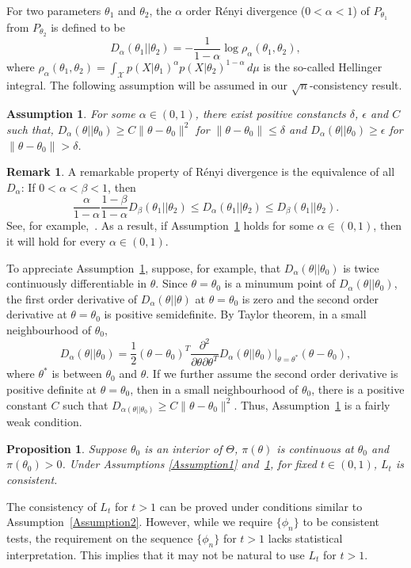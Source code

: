 \documentclass[3p]{elsarticle}
\theoremstyle{plain}
\newtheorem{proposition}{\quad\quad Proposition}
\newtheorem{assumption}{\quad\quad Assumption}
\theoremstyle{definition}
\newtheorem{remark}{\quad\quad Remark}
\theoremstyle{remark}
\begin{document}
 For two parameters $\theta_1$ and $\theta_2$, the $\alpha$ order R\'{e}nyi divergence ($0<\alpha<1$) of $P_{\theta_1}$ from $P_{\theta_2}$ is defined to be
$$
D_{\alpha}(\theta_1||\theta_2)=-\frac{1}{1-\alpha}\log \rho_{\alpha}(\theta_1,\theta_2),
$$
where
$
\rho_{\alpha}(\theta_1,\theta_2)=\int_{\mathcal{X}} p(X|\theta_1)^{\alpha} p(X|\theta_2)^{1-\alpha} \, d \mu
$ is the so-called Hellinger integral.
The following assumption will be assumed in our $\sqrt{n}$-consistency result.
\begin{assumption}\label{Assumption4}
    For some $\alpha\in(0,1)$, there exist positive constancts $\delta$, $\epsilon$ and $C$ such that,
     $D_{\alpha}(\theta||\theta_0)  \geq  C \|\theta-\theta_0\|^2$ for $\|\theta-\theta_0\|\leq \delta$ and $D_{\alpha}(\theta||\theta_0) \geq \epsilon$ for $\|\theta-\theta_0\|>\delta$.
\end{assumption}
\begin{remark}
    A remarkable property of R\'{e}nyi divergence is the equivalence of all $D_{\alpha}$: If $0<\alpha<\beta<1$, then
    $$
    \frac{\alpha}{1-\alpha}\frac{1-\beta}{1-\alpha} D_{\beta}(\theta_1||\theta_2)
    \leq D_{\alpha}(\theta_1||\theta_2)\leq D_{\beta}(\theta_1||\theta_2).
    $$
    See, for example,~\cite{2016arXiv160801805B}.
    As a result, if Assumption~\ref{Assumption4} holds for some $\alpha\in(0,1)$, then it will hold for every $\alpha\in(0,1)$.
\end{remark}
To appreciate Assumption~\ref{Assumption4},
   suppose, for example, that $D_{\alpha}(\theta||\theta_0)$ is twice continuously differentiable in $\theta$.
   Since $\theta=\theta_0$ is a minumum point of  $D_{\alpha}(\theta||\theta_0)$, the first order derivative of $D_{\alpha}(\theta||\theta)$ at $\theta=\theta_0$ is zero and the second order derivative at $\theta=\theta_0$ is positive semidefinite.
By Taylor theorem, in a small neighbourhood of $\theta_0$,
   $$
   D_{\alpha}(\theta||\theta_0)=\frac{1}{2}(\theta-\theta_0)^T \frac{\partial^2}{\partial \theta \partial \theta^T} D_{\alpha}(\theta||\theta_0)\Big|_{\theta=\theta^*}  (\theta-\theta_0),
   $$
   where $\theta^*$ is between $\theta_0$ and $\theta$.
   If we further assume the second order derivative is positive definite at $\theta=\theta_0$, then in a small neighbourhood of $\theta_0$, there is a positive constant $C$ such that $D_{\alpha(\theta||\theta_0)}\geq C\|\theta-\theta_0\|^2$.
   Thus, Assumption~\ref{Assumption4} is a fairly weak condition.
\begin{proposition}\label{Theoremless1}
    Suppose $\theta_0$ is an interior of $\Theta$, $\pi(\theta)$ is continuous at $\theta_0$ and $\pi(\theta_0)>0$.
    Under Assumptions \ref{Assumption1} and~\ref{Assumption4}, for fixed $t\in(0,1)$, $L_t$ is consistent.
\end{proposition}
The consistency of $L_t$ for $t>1$ can be proved under conditions similar to Assumption~\ref{Assumption2}.
However, while we require $\{\phi_n\}$ to be consistent tests, the requirement on the sequence $\{\phi_n\}$ for $t>1$ lacks statistical interpretation.
This implies that it may not be natural to use $L_t$ for $t>1$.
\end{document}
